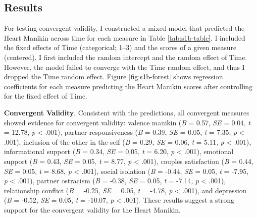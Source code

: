 \documentclass[
]{udthesis}
\begin{document}
\subsection{Results}\label{results-1}

For testing convergent validity, I constructed a mixed model that
predicted the Heart Manikin across time for each measure in Table
\ref{tab:s1b-table}. I included the fixed effects of Time (categorical;
1--3) and the scores of a given measure (centered). I first included the
random intercept and the random effect of Time. However, the model
failed to converge with the Time random effect, and thus I dropped the
Time random effect. Figure \ref{fig:s1b-forest} shows regression
coefficients for each measure predicting the Heart Manikin scores after
controlling for the fixed effect of Time.

\textbf{Convergent Validity}. Consistent with the predictions, all convergent
measures showed evidence for convergent validity: valence manikin
(\emph{B} = 0.57, \emph{SE} = 0.04, \emph{t} = 12.78, \emph{p} \textless{} .001), partner responsiveness
(\emph{B} = 0.39, \emph{SE} = 0.05, \emph{t} = 7.35, \emph{p} \textless{} .001), inclusion of the other in the self
(\emph{B} = 0.29, \emph{SE} = 0.06, \emph{t} = 5.11, \emph{p} \textless{} .001), informational support
(\emph{B} = 0.34, \emph{SE} = 0.05, \emph{t} = 6.20, \emph{p} \textless{} .001), emotional support
(\emph{B} = 0.43, \emph{SE} = 0.05, \emph{t} = 8.77, \emph{p} \textless{} .001), couples satisfaction
(\emph{B} = 0.44, \emph{SE} = 0.05, \emph{t} = 8.68, \emph{p} \textless{} .001), social isolation
(\emph{B} = -0.44, \emph{SE} = 0.05, \emph{t} = -7.95, \emph{p} \textless{} .001), partner ostracism
(\emph{B} = -0.38, \emph{SE} = 0.05, \emph{t} = -7.14, \emph{p} \textless{} .001), relationship conflict
(\emph{B} = -0.25, \emph{SE} = 0.05, \emph{t} = -4.78, \emph{p} \textless{} .001), and depression
(\emph{B} = -0.52, \emph{SE} = 0.05, \emph{t} = -10.07, \emph{p} \textless{} .001). These results suggest a strong support for
the convergent validity for the Heart Manikin.
\end{document}
